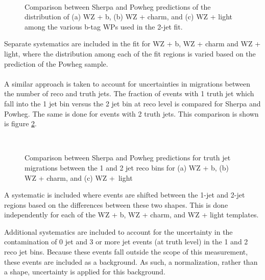\begin{figure}[H]
    \centering
    \\
    \caption{Comparison between Sherpa and Powheg predictions of the distribution of (a) WZ + b, (b) WZ + charm, and (c) WZ + light among the various b-tag WPs used in the 2-jet fit.}
\label{fig:powheg2j}
\end{figure}

Separate systematics are included in the fit for WZ + b, WZ + charm and WZ + light, where the distribution among each of the fit regions is varied based on the prediction of the Powheg sample.

\paragraph{}
A similar approach is taken to account for uncertainties in migrations between the number of reco and truth jets. The fraction of events with 1 truth jet which fall into the 1 jet bin versus the 2 jet bin at reco level is compared for Sherpa and Powheg. The same is done for events with 2 truth jets. This comparison is shown is figure \ref{fig:migration12}.

\begin{figure}[H]
    \centering
    \\
    \caption{Comparison between Sherpa and Powheg predictions for truth jet migrations between the 1 and 2 jet reco bins for (a) WZ + b, (b) WZ + charm, and (c) WZ +\ light}
\label{fig:migration12}
\end{figure}

A systematic is included where events are shifted between the 1-jet and 2-jet regions based on the differences between these two shapes. This is done independently for each of the WZ + b, WZ + charm, and WZ + light templates.

Additional systematics are included to account for the uncertainty in the contamination of 0 jet and 3 or more jet events (at truth level) in the 1 and 2 reco jet bins. Because these events fall outside the scope of this measurement, these events are included as a background. As such, a normalization, rather than a shape, uncertainty is applied for this background.

